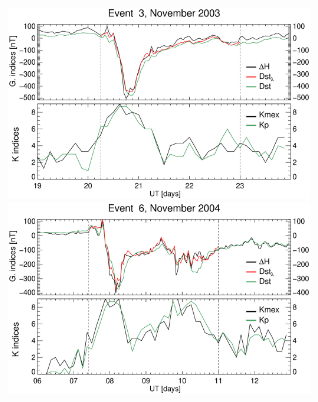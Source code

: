 \documentclass[a4paper,fleqn]{cas-dc}
\begin{document}


\begin{figure}[h!]
	\centering
	\centerline{\Large \bf   
		\hfill}
	\centerline{\Large \bf   
		\hspace{0.26\textwidth}  \color{black}{}
		\hspace{0.31\textwidth}  \color{black}{}
		\hfill}
	\includegraphics[width=8.0cm]{images/dH_approx/diono_valid_V4_2003-11-19.eps}
	\includegraphics[width=8.0cm]{images/dH_approx/diono_valid_V4_2004-11-06.eps} 		


\end{figure}
\end{document}
